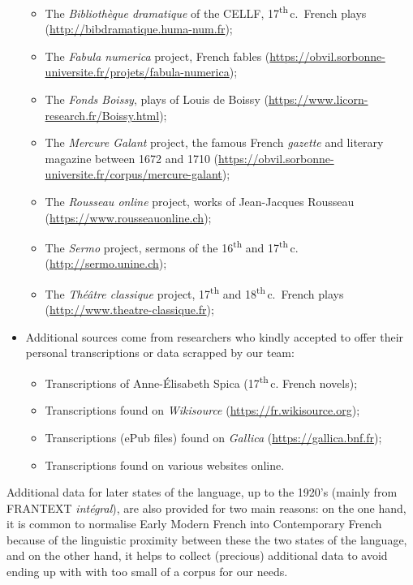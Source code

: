 \begin{itemize}
\begin{itemize}
              \item The \textit{Bibliothèque dramatique} of the CELLF, 17\textsuperscript{th}\,c.~French plays (\url{http://bibdramatique.huma-num.fr});
              \item The \textit{Fabula numerica} project, French fables (\url{https://obvil.sorbonne-universite.fr/projets/fabula-numerica});
              \item The \textit{ Fonds Boissy}, plays of Louis de Boissy (\url{https://www.licorn-research.fr/Boissy.html});
              \item The \textit{Mercure Galant} project, the famous French \textit{gazette} and literary magazine between 1672 and 1710 (\url{https://obvil.sorbonne-universite.fr/corpus/mercure-galant});
              \item The \textit{Rousseau online} project, works of Jean-Jacques Rousseau (\url{https://www.rousseauonline.ch});
              \item The \textit{Sermo} project, sermons of the 16\textsuperscript{th} and 17\textsuperscript{th}\,c. (\url{http://sermo.unine.ch});
              \item The \textit{Théâtre classique} project, 17\textsuperscript{th} and 18\textsuperscript{th}\,c.~French plays (\url{http://www.theatre-classique.fr});
          \end{itemize}
    \item Additional sources come from researchers who kindly accepted to offer their personal transcriptions or data scrapped by our team:
          \begin{itemize}
              \item Transcriptions of Anne-Élisabeth Spica (17\textsuperscript{th}\,c. French novels);
              \item Transcriptions found on \textit{Wikisource} (\url{https://fr.wikisource.org});
              \item Transcriptions (ePub files) found on \textit{Gallica} (\url{https://gallica.bnf.fr});
              \item Transcriptions found on various websites online.
          \end{itemize}
\end{itemize}

Additional data for later states of the language, up to the 1920's (mainly from FRANTEXT \textit{intégral}), are also provided for two main reasons: on the one hand, it is common to normalise Early Modern French into Contemporary French \cite{gabay_pourquoi_2014} because of the linguistic proximity between these the two states of the language, and on the other hand, it helps to collect (precious) additional data to avoid ending up with with too small of a corpus for our needs.

